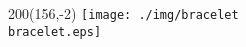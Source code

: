 \documentclass[a4paper,12pt]{article}
\begin{document}
\setmainfont{Helvetica Neue Light}


\begin{textblock}{200}(156,-2)
\texttt{[image: ./img/bracelet\\bracelet.eps]}
\end{textblock}
\begin{center}
\fontsize{20}{24}
\selectfont
\name\\
\vspace{0.3cm}
\fontsize{16}{20}
\selectfont
{}
\end{center}

\fontsize{20}{24}
\selectfont
\vfill
\begin{enumerate}
\steps
\end{enumerate}
\vfill
\vfill
\end{document}
